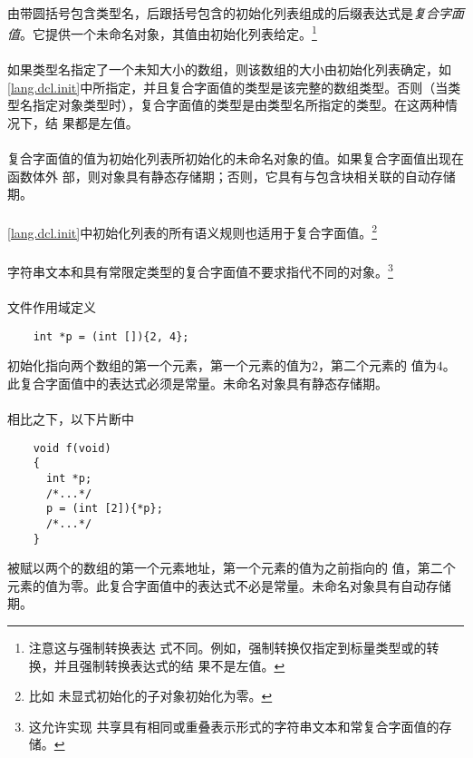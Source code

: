 {\semantic
\paragraph{}
由带圆括号包含类型名，后跟括号包含的初始化列表组成的后缀表达式是\textit{复合字面
值}。它提供一个未命名对象，其值由初始化列表给定。\footnote{注意这与强制转换表达
式不同。例如，强制转换仅指定到标量类型或的转换，并且强制转换表达式的结
果不是左值。}

\paragraph{}
如果类型名指定了一个未知大小的数组，则该数组的大小由初始化列表确定，如
\ref{lang.dcl.init}中所指定，并且复合字面值的类型是该完整的数组类型。否则（当类
型名指定对象类型时），复合字面值的类型是由类型名所指定的类型。在这两种情况下，结
果都是左值。

\paragraph{}
复合字面值的值为初始化列表所初始化的未命名对象的值。如果复合字面值出现在函数体外
部，则对象具有静态存储期；否则，它具有与包含块相关联的自动存储期。

\paragraph{}
\ref{lang.dcl.init}中初始化列表的所有语义规则也适用于复合字面值。\footnote{比如
未显式初始化的子对象初始化为零。}

\paragraph{}
字符串文本和具有常限定类型的复合字面值不要求指代不同的对象。\footnote{这允许实现
共享具有相同或重叠表示形式的字符串文本和常复合字面值的存储。}

\paragraph{}
\ex 文件作用域定义
\begin{lstlisting}
    int *p = (int []){2, 4};
\end{lstlisting}
初始化指向两个数组的第一个元素，第一个元素的值为$2$，第二个元素的
值为$4$。此复合字面值中的表达式必须是常量。未命名对象具有静态存储期。

\paragraph{}
\ex 相比之下，以下片断中
\begin{lstlisting}
    void f(void)
    {
      int *p;
      /*...*/
      p = (int [2]){*p};
      /*...*/
    }
\end{lstlisting}
被赋以两个的数组的第一个元素地址，第一个元素的值为之前指向的
值，第二个元素的值为零。此复合字面值中的表达式不必是常量。未命名对象具有自动存储
期。

}
